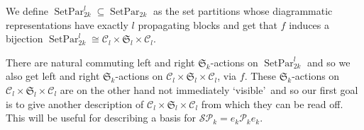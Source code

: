\documentclass[10pt,hidelinks]{article}
\newcommand{\ParAlg}{{\mathcal P }_{k}}
\newcommand{\SpheAlg}{{\mathcal{SP} }_{k}}
\newcommand{\Si}{\mathfrak{S}}
\newcommand{\SetPar}{ \operatorname{SetPar}}
\numberwithin{equation}{section}
\begin{document}
\medskip
We define $ \SetPar_{2k}^l   \subseteq \SetPar_{2k} $ as the set partitions whose 
diagrammatic representations
have exactly $ l $ propagating blocks and get that 
$ f $ induces a bijection $ \SetPar_{2k}^l  \cong 
{ \mathcal C }_l  \times  \Si_l  \times { \mathcal C }_l  $. 
\medskip

There are natural commuting left and right $ \Si_k $-actions on $\SetPar_{2k}^l  $ and so we also get   
left and right $ \Si_k $-actions on $ { \mathcal C }_l  \times  \Si_l  \times { \mathcal C }_l  $, via $ f$. 
These $ \Si_k $-actions on $ { \mathcal C }_l  \times  \Si_l  \times { \mathcal C }_l  $ are{\color{black}{,}} on the other
hand{\color{black}{,}} not
immediately  \lq visible\rq\, and so our first goal  
is to give another description of
$ { \mathcal C }_l  \times  \Si_l  \times { \mathcal C }_l  $ 
from which they can be read off. This
will be useful for describing a basis for $ \SpheAlg = e_k \ParAlg e_k$.

\medskip
\end{document}
